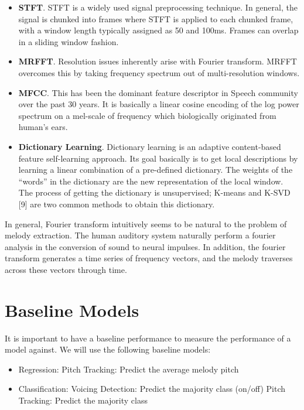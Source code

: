 \documentclass{article} %
\begin{document}
\begin{itemize}
\item \textbf{STFT}. STFT is a widely used signal preprocessing technique. In general, the signal is chunked into frames where STFT is applied to each chunked frame, with a window length typically assigned as 50 and 100ms. Frames can overlap in a sliding window fashion.

\item \textbf{MRFFT}. Resolution issues inherently arise with Fourier transform. MRFFT overcomes this by taking frequency spectrum out of multi-resolution windows.

\item \textbf{MFCC}. This has been the dominant feature descriptor in Speech community over the past 30 years. It is basically a linear cosine encoding of the log power spectrum on a mel-scale of frequency which biologically originated from human's ears. 

\item \textbf{Dictionary Learning}. Dictionary learning is an adaptive content-based feature self-learning approach. Its goal basically is to get local descriptions by learning a linear combination of a pre-defined dictionary. 
The weights of the “words” in the dictionary are the new representation of the local window. The process of getting the dictionary is unsupervised; K-means and K-SVD [9] are two common methods to obtain this dictionary.
\end{itemize}

In general, Fourier transform intuitively seems to be natural to the problem of melody extraction.  The human auditory system naturally perform a fourier analysis in the conversion of sound to neural impulses.  In addition, the fourier transform generates a time series of frequency vectors, and the melody traverses across these vectors through time.

\section{Baseline Models}

It is important to have a baseline performance to measure the performance of a model against.  We will use the following baseline models:

\begin{itemize}
\item Regression:
\subitem Pitch Tracking: Predict the average melody pitch
\item Classification:
\subitem Voicing Detection:  Predict the majority class (on/off)
\subitem Pitch Tracking: Predict the majority class
\end{itemize}
\end{document}
